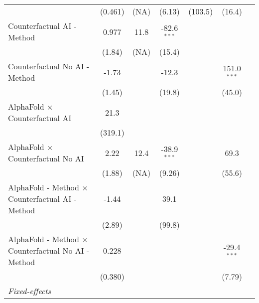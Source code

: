 \begin{tabular}{lcccccc}
                                                              & (0.461)     & (NA)                  & (6.13)        & (103.5)     & (16.4)        &   \\   
   Counterfactual AI - Method                                 & 0.977       & 11.8                  & -82.6$^{***}$ &             &               &   \\   
                                                              & (1.84)      & (NA)                  & (15.4)        &             &               &   \\   
   Counterfactual No AI - Method                              & -1.73       &                       & -12.3         &             & 151.0$^{***}$ &   \\   
                                                              & (1.45)      &                       & (19.8)        &             & (45.0)        &   \\   
   AlphaFold $\times$ Counterfactual AI                       & 21.3        &                       &               &             &               &   \\   
                                                              & (319.1)     &                       &               &             &               &   \\   
   AlphaFold $\times$ Counterfactual No AI                    & 2.22        & 12.4                  & -38.9$^{***}$ &             & 69.3          &   \\   
                                                              & (1.88)      & (NA)                  & (9.26)        &             & (55.6)        &   \\   
   AlphaFold - Method $\times$ Counterfactual AI - Method     & -1.44       &                       & 39.1          &             &               &   \\   
                                                              & (2.89)      &                       & (99.8)        &             &               &   \\   
   AlphaFold - Method $\times$ Counterfactual No AI - Method  & 0.228       &                       &               &             & -29.4$^{***}$ &   \\   
                                                              & (0.380)     &                       &               &             & (7.79)        &   \\   
   \midrule
   \emph{Fixed-effects}\\

\end{tabular}
